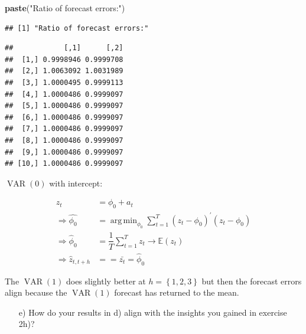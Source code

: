 \documentclass[12pt,a4paper]{article}
\DeclareMathOperator*{\argmin}{arg\,min}
\newcommand{\VAR}{\operatorname{VAR}} %
\newenvironment{Shaded}{\begin{snugshade}}{\end{snugshade}}
\newcommand{\DataTypeTok}[1]{\textcolor[rgb]{0.13,0.29,0.53}{#1}}
\newcommand{\DecValTok}[1]{\textcolor[rgb]{0.00,0.00,0.81}{#1}}
\newcommand{\KeywordTok}[1]{\textcolor[rgb]{0.13,0.29,0.53}{\textbf{#1}}}
\newcommand{\NormalTok}[1]{#1}
\newcommand{\OperatorTok}[1]{\textcolor[rgb]{0.81,0.36,0.00}{\textbf{#1}}}
\newcommand{\OtherTok}[1]{\textcolor[rgb]{0.56,0.35,0.01}{#1}}
\newcommand{\StringTok}[1]{\textcolor[rgb]{0.31,0.60,0.02}{#1}}
\begin{document}
\begin{Shaded}
\begin{Highlighting}[]
\KeywordTok{paste}\NormalTok{(}\StringTok{"Ratio of forecast errors:"}\NormalTok{)}
\end{Highlighting}
\end{Shaded}

\begin{verbatim}
## [1] "Ratio of forecast errors:"
\end{verbatim}

\begin{Shaded}
\end{Shaded}

\begin{verbatim}
##            [,1]      [,2]
##  [1,] 0.9998946 0.9999708
##  [2,] 1.0063092 1.0031989
##  [3,] 1.0000495 0.9999113
##  [4,] 1.0000486 0.9999097
##  [5,] 1.0000486 0.9999097
##  [6,] 1.0000486 0.9999097
##  [7,] 1.0000486 0.9999097
##  [8,] 1.0000486 0.9999097
##  [9,] 1.0000486 0.9999097
## [10,] 1.0000486 0.9999097
\end{verbatim}

\(\VAR(0)\) with intercept:

\begin{align*}
  z_t & = \phi_0 + a_t\\
  \Rightarrow \hat{\phi_0} & = \argmin_{\phi_0} \sum_{t = 1}^{T} \left(z_t - \phi_0 \right)^{'} \left(z_t - \phi_0 \right)\\
  \Rightarrow \hat{\phi}_0 & = \dfrac{1}{T} \sum_{t = 1}^{T} z_t \rightarrow \mathbb{E} (z_t)\\
  \Rightarrow \hat{z}_{t,t+h} &= = \bar{z_t} = \hat{\phi}_0
\end{align*}

The \(\VAR(1)\) does slightly better at \(h = \left\{ 1,2,3 \right\}\)
but then the forecast errors align because the \(\VAR(1)\) forecast has
returned to the mean.

\begin{itemize}
  \item[e)] How do your results in d) align with the insights you gained in exercise 2h)?
\end{itemize}
\end{document}
